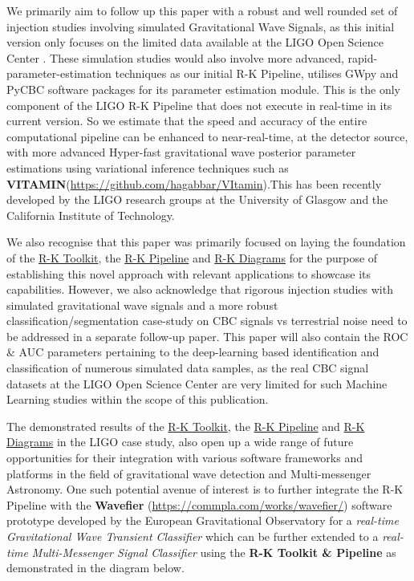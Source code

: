 We primarily aim to follow up this paper with a robust and well rounded set of injection studies involving simulated Gravitational Wave Signals, as this initial version only focuses on the limited data available at the LIGO Open Science Center \cite{00_LIGOOpenSciData}. These simulation studies would also involve more advanced, rapid-parameter-estimation techniques as our initial R-K Pipeline, utilises GWpy \cite{25.4_CBC2021gwpy} and PyCBC \cite{25.5_2019pycbcInference} software packages for its parameter estimation module. This is the only component of the LIGO R-K Pipeline that does not execute in real-time in its current version. So we estimate that the speed and accuracy of the entire computational pipeline can be enhanced to near-real-time, at the detector source, with more advanced Hyper-fast gravitational wave posterior parameter estimations using variational inference techniques such as \textbf{VITAMIN}(\hyperlink{website}{https://github.com/hagabbar/VItamin}).This has been recently developed by the LIGO research groups at the University of Glasgow and the California Institute of Technology. \cite{25.6_Glasgow2019VITAMIN}

We also recognise that this paper was primarily focused on laying the foundation of the \hyperref[subsec:R-K Toolkit]{R-K Toolkit}, the \hyperref[subsec:R-K Pipeline]{R-K Pipeline} and \hyperref[subsec:R-K Diagram]{R-K Diagrams} for the purpose of establishing this novel approach with relevant applications to showcase its capabilities. However, we also acknowledge that rigorous injection studies with simulated gravitational wave signals and a more robust classification/segmentation case-study on CBC signals vs terrestrial noise need to be addressed in a separate follow-up paper. This paper will also contain the ROC \& AUC parameters pertaining to the deep-learning based identification  and classification of numerous simulated data samples, as the real CBC signal datasets at the LIGO Open Science Center \cite{00_LIGOOpenSciData} are very limited for such Machine Learning studies within the scope of this publication.

The demonstrated results of the \hyperref[subsec:R-K Toolkit]{R-K Toolkit}, the \hyperref[subsec:R-K Pipeline]{R-K Pipeline} and \hyperref[subsec:R-K Diagram]{R-K Diagrams} in the LIGO case study, also open up a wide range of future opportunities for their integration with various software frameworks and platforms in the field of gravitational wave detection and Multi-messenger Astronomy. One such potential avenue of interest is to further integrate the R-K Pipeline with the \textbf{Wavefier} (\hyperlink{website}{https://commpla.com/works/wavefier/}) software prototype developed by the European Gravitational Observatory for a \textit{real-time Gravitational Wave Transient Classifier} which can be further extended to a \textit{real-time Multi-Messenger Signal Classifier} using the \textbf{R-K Toolkit \& Pipeline} as demonstrated in the diagram below.\cite{25.7_cuoco2022Wavefier}

